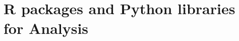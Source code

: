 \begin{comment}
\section{Supplementary Note 3}
\label{sec:suppnote3}

\subsubsection{Cell-Cell Interactions}


To infer CCIs from scRNA-seq data, CellChat makes use of \textbf{CellChatDB}, a database of literature supported LRIs, in both mouse and human. CellChatDB is specific as it contains LRIs involving multimeric receptors, cofactor molecules as well as co-stimulatory or co-inhibitory membrane bound receptors, and is grouped into several signalling pathway families. In addition, CellChatDB allows for updating of the database by adding user-defined ligand-receptor pairs. Next, to infer intercellular communications from scRNA-seq data, CellChat first identifies differential signalling genes across all cell-types in the data using the Wilcoxon rank sum test, and for these differential genes, computes the \textbf{“ensemble average expression”} in the cell-type. Following this, a communication probability value for every LRI pair is modelled based on the \textbf{Law of Mass Action} and a \textbf{Hill function}. By using the expression levels of ligands and receptors as “proxies” for their concentration and modelling interactions with expression-based Hill functions \footnote{In CellChat, the Hill function is used to incorporate the effects of positive and negative effectors into the framework, thereby providing a more nuanced and accurate model of cell-cell communication}. In addition, the frequencies of the cell-types are also accounted for in the probability calculation. Finally, significant interactions between two cell-types are identified on the basis of a random permutation test <add footnote here>   . Using centrality metrics from graph theory, CellChat identifies higher order information from a weighted-directed network, wherein the computed communication probabilities are used as weights. This allows for the identification of dominant signalling sources as well as mediators and influencers within the network. CellChat can also predict key outgoing and incoming signals for specific cell-types as well as coordinated responses amongst different cell-types by pattern recognition approaches based on non-negative matrix factorization. An important application of CellChat is the joint analyses of two or more datasets by constructing a shared manifold space using a shared nearest neighbour (SNN) similarity network. This enables the identification of conserved as well as context-specific interactions between the datasets being compared.    
\end{comment}

\chapter{R packages and Python libraries for  Analysis}
\label{chp:app_packages}

